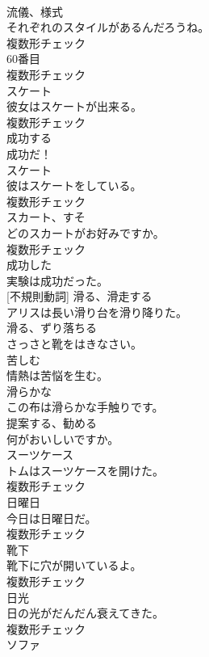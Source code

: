 \documentclass[8pt]{extreport}
\begin{document}
\begin{CJK}{UTF8}{min}
\\	[名詞]	流儀、様式	
\\	それぞれのスタイルがあるんだろうね。	
\\	複数形チェック
\\	[名詞]	60番目	
\\	複数形チェック
\\	[名詞]	スケート	
\\	彼女はスケートが出来る。	
\\	複数形チェック
\\	[動詞]	成功する	
\\	成功だ！	
\\	[名詞]	スケート	
\\	彼はスケートをしている。	
\\	複数形チェック
\\	[名詞]	スカート、すそ	
\\	どのスカートがお好みですか。	
\\	複数形チェック
\\	[形容詞]	成功した	
\\	実験は成功だった。	
\\	[動詞] [不規則動詞]	滑る、滑走する	
\\	アリスは長い滑り台を滑り降りた。	
\\	[動詞]	滑る、ずり落ちる	
\\	さっさと靴をはきなさい。	
\\	[動詞]	苦しむ	
\\	情熱は苦悩を生む。	
\\	[形容詞]	滑らかな	
\\	この布は滑らかな手触りです。	
\\	[動詞]	提案する、勧める	
\\	何がおいしいですか。	
\\	[名詞]	スーツケース	
\\	トムはスーツケースを開けた。	
\\	複数形チェック
\\	[名詞]	日曜日	
\\	今日は日曜日だ。	
\\	複数形チェック
\\	[名詞]	靴下	
\\	靴下に穴が開いているよ。	
\\	複数形チェック
\\	[名詞]	日光	
\\	日の光がだんだん衰えてきた。	
\\	複数形チェック
\\	[名詞]	ソファ	

\end{CJK}
\end{document}
